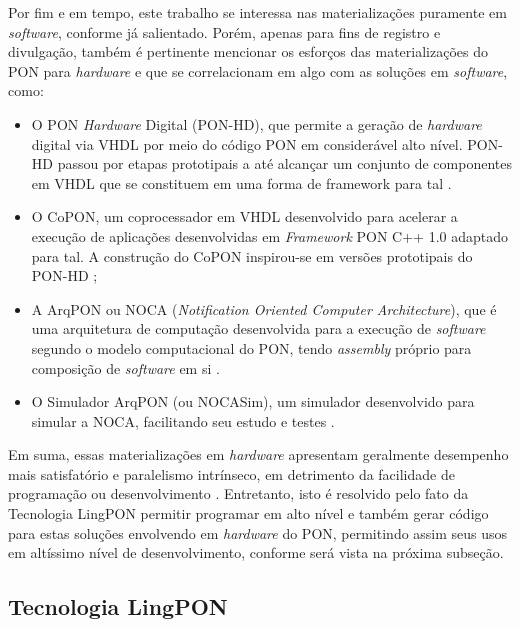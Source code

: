 Por fim e em tempo, este trabalho se interessa nas materializações puramente em
\textit{software}, conforme já salientado. Porém, apenas para fins de registro e
divulgação, também é pertinente mencionar os esforços das materializações do PON
para \textit{hardware} e que se correlacionam em algo com as soluções em \textit{software}, como: 

\begin{itemize}
  \item O PON \textit{Hardware} Digital (PON-HD), que permite a geração de
  \textit{hardware} digital via VHDL por meio do código PON em considerável alto
  nível. PON-HD passou por etapas prototipais a até alcançar um conjunto de
  componentes em VHDL que se constituem em uma forma de framework para tal
  \cite{doc_Kerschbaumer_2018,kerschbaumer_2018_2,kerschbaumer_2018_1}.
  \item O CoPON, um coprocessador em VHDL desenvolvido para acelerar a execução
  de aplicações desenvolvidas em \textit{Framework} PON C++ 1.0 adaptado para
  tal. A construção do CoPON inspirou-se em versões prototipais do PON-HD
  \cite{msc_Peters_2012,peters_2012}; 
  \item A ArqPON ou NOCA (\textit{Notification Oriented Computer Architecture}), que é
  uma arquitetura de computação desenvolvida para a execução de
  \textit{software} segundo o modelo computacional do PON, tendo \textit{assembly}
  próprio para composição de \textit{software} em si
  \cite{doc_linhares_2015,linhares_2020}.
  \item O Simulador ArqPON (ou NOCASim), um simulador desenvolvido para simular
  a NOCA, facilitando seu estudo e testes \cite{msc_pordeus_2017,linhares_2020}. 
\end{itemize}

Em suma, essas materializações em \textit{hardware} apresentam geralmente
desempenho mais satisfatório e paralelismo intrínseco, em detrimento da
facilidade de programação ou desenvolvimento \cite{doc_ronszcka_2019}.
Entretanto, isto é resolvido pelo fato da Tecnologia LingPON permitir programar
em alto nível e também gerar código para estas soluções envolvendo em
\textit{hardware} do PON, permitindo assim seus usos em altíssimo nível de
desenvolvimento, conforme será vista na próxima subseção.


\subsection{Tecnologia LingPON}\label{sec:lingpon}


